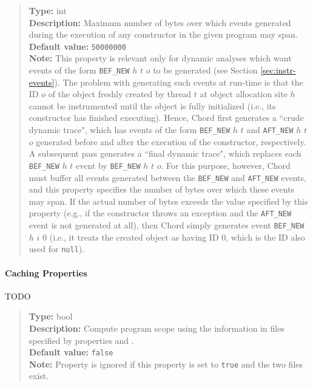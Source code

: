 \noindent {}
\begin{quote}
{\bf Type:} int \\
{\bf Description:} Maximum number of bytes over which events generated during the execution of any constructor in the given program may span. \\
{\bf Default value:} {\tt 50000000} \\
{\bf Note:} This property is relevant only for dynamic analyses which want events of the form {\tt BEF\_NEW} $h$ $t$ $o$ to be generated (see Section \ref{sec:instr-events}).  The problem with generating such events at run-time is that the ID $o$ of the object freshly created by thread $t$ at object allocation site $h$ cannot be instrumented until the object is fully initialized (i.e., its constructor has finished executing).  Hence, Chord first generates a ``crude dynamic trace", which has events of the form {\tt BEF\_NEW} $h$ $t$ and {\tt AFT\_NEW} $h$ $t$ $o$ generated before and after the execution of the constructor, respectively.  A subsequent pass generates a ``final dynamic trace", which replaces each {\tt BEF\_NEW} $h$ $t$ event by {\tt BEF\_NEW} $h$ $t$ $o$.  For this purpose, however, Chord must buffer all events generated between the {\tt BEF\_NEW} and {\tt AFT\_NEW} events, and this property specifies the number of bytes over which these events may span.  If the actual number of bytes exceeds the value specified by this property (e.g., if the constructor throws an exception and the {\tt AFT\_NEW} event is not generated at all), then Chord simply generates event {\tt BEF\_NEW} $h$ $i$ $0$ (i.e., it treats the created object as having ID 0, which is the ID also used for {\tt null}). 
\end{quote}

\paragraph{Caching Properties}

TODO

\noindent {}
\begin{quote}
{\bf Type:} bool \\
{\bf Description:} Compute program scope using the information in files specified by properties  and . \\
{\bf Default value:} {\tt false} \\
{\bf Note:} Property  is ignored if this property is set to {\tt true} and the two files exist. 
\end{quote}

